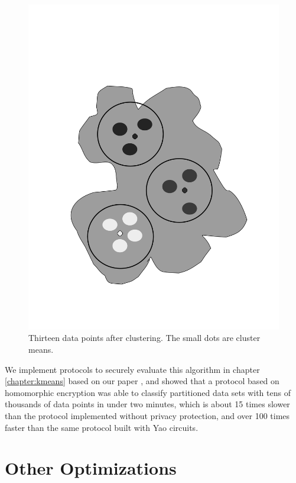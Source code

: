 %
\begin{figure}
\includegraphics[scale=0.3,angle=270]{chapters/clusters}

\caption{\label{fig:clusters}Thirteen data points after clustering. The small
dots are cluster means.}

\end{figure}


We implement protocols to securely evaluate this algorithm in chapter
\ref{chapter:kmeans} based on our paper \cite{kruger05}, and showed
that a protocol based on homomorphic encryption was able to classify
partitioned data sets with tens of thousands of data points in under
two minutes, which is about 15 times slower than the protocol implemented
without privacy protection, and over 100 times faster than the same
protocol built with Yao circuits.


\section{Other Optimizations}

